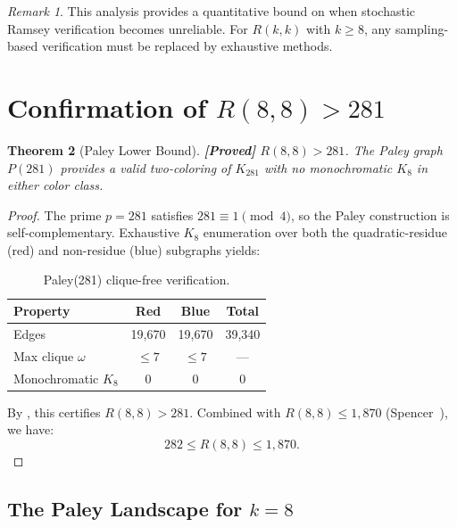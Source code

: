 \documentclass[12pt,a4paper]{article}
\newcommand{\proved}[1]{\textcolor{proved}{\textbf{[Proved]}} #1}
\newtheorem{theorem}{Theorem}[section]
\theoremstyle{definition}
\theoremstyle{remark}
\newtheorem{remark}[theorem]{Remark}
\newcommand{\Ramsey}[2]{R(#1,#2)}
\newcommand{\Kn}[1]{K_{#1}}
\begin{document}
\begin{remark}
This analysis provides a quantitative bound on when stochastic Ramsey verification becomes unreliable.  For $\Ramsey{k}{k}$ with $k \ge 8$, any sampling-based verification must be replaced by exhaustive methods.
\end{remark}

\section{Confirmation of $R(8,8) > 281$}
\label{sec:paley281}

\begin{theorem}[Paley Lower Bound]
\label{thm:paley281}
\proved{$\Ramsey{8}{8} > 281$.  The Paley graph $P(281)$ provides a valid two-coloring of $\Kn{281}$ with no monochromatic $K_8$ in either color class.}
\end{theorem}

\begin{proof}
The prime $p = 281$ satisfies $281 \equiv 1 \pmod{4}$, so the Paley construction is self-complementary.  Exhaustive $K_8$ enumeration over both the quadratic-residue (red) and non-residue (blue) subgraphs yields:

\begin{table}[H]
\centering
\caption{Paley(281) clique-free verification.}
\label{tab:paley281}
\begin{tabular}{@{}lccc@{}}
\toprule
\textbf{Property} & \textbf{Red} & \textbf{Blue} & \textbf{Total} \\
\midrule
Edges & 19{,}670 & 19{,}670 & 39{,}340 \\
Max clique $\omega$ & $\le 7$ & $\le 7$ & --- \\
Monochromatic $K_8$ & 0 & 0 & 0 \\
\bottomrule
\end{tabular}
\end{table}

\noindent By , this certifies $\Ramsey{8}{8} > 281$.  Combined with $\Ramsey{8}{8} \le 1{,}870$ (Spencer~\cite{Spencer1975}), we have:
\begin{equation}
282 \le \Ramsey{8}{8} \le 1{,}870.
\end{equation}
\end{proof}

\subsection{The Paley Landscape for $k = 8$}
\end{document}
